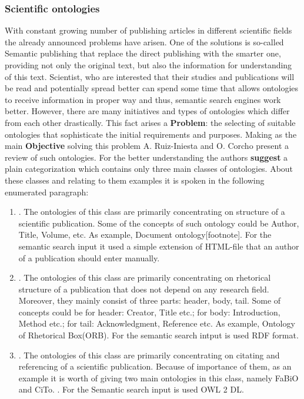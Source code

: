 		\subsubsection{Scientific ontologies}
		With constant growing number of publishing articles in different scientific fields the already announced problems have arisen. One of the solutions is so-called Semantic publishing that replace the direct publishing with the smarter one, providing not only the original text, but also the information for understanding of this text. Scientist, who are interested that their studies and publications will be read and potentially spread better can spend some time that allows ontologies to receive information in proper way and thus, semantic search engines work better. However, there are many initiatives and types of ontologies which differ from each other drastically. This fact arises a \textbf{Problem}: the selecting of suitable ontologies that sophisticate the initial requirements and purposes. Making as the main \textbf{Objective} solving this problem A. Ruiz-Iniesta and O. Corcho present a review of such ontologies\cite{Cor14}.
		For the better understanding the authors \textbf{suggest} a plain categorization which contains only three main classes of ontologies. About these classes and relating to them examples it is spoken in the following enumerated paragraph:
			\begin{enumerate}
				\item {}\frqq. The ontologies of this class are primarily concentrating on structure of a scientific publication. Some of the concepts of such ontology could be Author, Title, Volume, etc. As example, Document ontology[footnote]. For the semantic search input it used a simple extension of HTML-file that an author of a publication should enter manually.
				
				\item {}\frqq. The ontologies of this class are primarily concentrating on rhetorical structure of a publication that does not depend on any research field. Moreover, they mainly consist of three parts: header, body, tail. Some of concepts could be for header: Creator, Title etc.; for body: Introduction, Method etc.; for tail: Acknowledgment, Reference etc. As example, Ontology of Rhetorical Box(ORB). For the semantic search intput is used RDF format.  
				
				\item {}\frqq.  The ontologies of this class are primarily concentrating on citating and referencing of a scientific publication. Because of importance of them, as an example it is worth of giving two main ontologies in this class, namely FaBiO and CiTo. \frqq\cite{Per12}. For the Semantic search input is used OWL 2 DL. 
			\end{enumerate}
